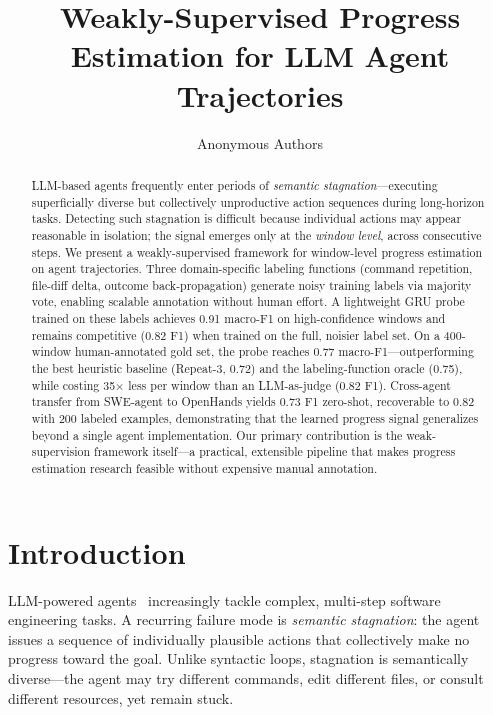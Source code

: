 \documentclass[11pt]{article}
\title{Weakly-Supervised Progress Estimation for LLM Agent Trajectories}
\author{
  Anonymous Authors
}
\date{}
\begin{document}
\maketitle

\begin{abstract}
LLM-based agents frequently enter periods of \emph{semantic stagnation}---executing superficially diverse but collectively unproductive action sequences during long-horizon tasks. Detecting such stagnation is difficult because individual actions may appear reasonable in isolation; the signal emerges only at the \emph{window level}, across consecutive steps.
We present a weakly-supervised framework for window-level progress estimation on agent trajectories. Three domain-specific labeling functions (command repetition, file-diff delta, outcome back-propagation) generate noisy training labels via majority vote, enabling scalable annotation without human effort. A lightweight GRU probe trained on these labels achieves 0.91 macro-F1 on high-confidence windows and remains competitive (0.82 F1) when trained on the full, noisier label set.
On a 400-window human-annotated gold set, the probe reaches 0.77 macro-F1---outperforming the best heuristic baseline (Repeat-3, 0.72) and the labeling-function oracle (0.75), while costing 35$\times$ less per window than an LLM-as-judge (0.82 F1). Cross-agent transfer from SWE-agent to OpenHands yields 0.73 F1 zero-shot, recoverable to 0.82 with 200 labeled examples, demonstrating that the learned progress signal generalizes beyond a single agent implementation.
Our primary contribution is the weak-supervision framework itself---a practical, extensible pipeline that makes progress estimation research feasible without expensive manual annotation.
\end{abstract}

\section{Introduction}
\label{sec:intro}

LLM-powered agents~\cite{yao2023react,yang2024swebench} increasingly tackle complex, multi-step software engineering tasks. A recurring failure mode is \emph{semantic stagnation}: the agent issues a sequence of individually plausible actions that collectively make no progress toward the goal. Unlike syntactic loops, stagnation is semantically diverse---the agent may try different commands, edit different files, or consult different resources, yet remain stuck.
\end{document}
